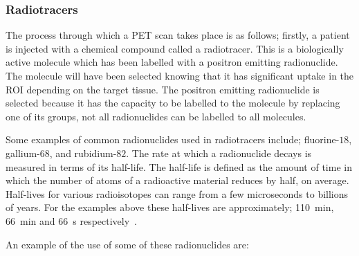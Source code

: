             \subsubsection{Radiotracers} \label{sec:radiotracers}
                The process through which a \gls{PET} scan takes place is as follows; firstly, a patient is injected with a chemical compound called a radiotracer. This is a biologically active molecule which has been labelled with a positron emitting radionuclide. The molecule will have been selected knowing that it has significant uptake in the \gls{ROI} depending on the target tissue. %
                The positron emitting radionuclide is selected because it has the capacity to be labelled to the molecule by replacing one of its groups, not all radionuclides can be labelled to all molecules. %
                
                Some examples of common radionuclides used in radiotracers include; fluorine-$18$, gallium-$68$, and rubidium-$82$. %
                The rate at which a radionuclide decays is measured in terms of its half-life. The half-life is defined as the amount of time in which the number of atoms of a radioactive material reduces by half, on average. Half-lives for various radioisotopes can range from a few microseconds to billions of years. For the examples above these half-lives are approximately; \SI{110}{\minute}, \SI{66}{\minute} and \SI{66}{\second} respectively~. %
                
                An example of the use of some of these radionuclides are:
                
